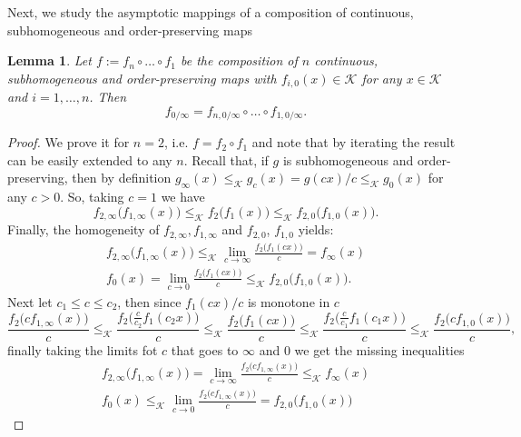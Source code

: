 \documentclass{article}
\newtheorem{lemma}[theorem]{Lemma}
\newcommand{\cone}{\mathcal{K}}
\newcommand{\cleq}{\leq_{\cone}}
\begin{document}
%
%
Next, we study the asymptotic mappings of a composition of continuous, subhomogeneous and order-preserving maps
%
\begin{lemma}\label{Lemma_limits_of_compositions}
    Let $f:=f_n\circ \dots \circ f_1$ be the composition of $n$ continuous, subhomogeneous and order-preserving maps with $f_{i,0}(x)\in\cone$ for any $x\in \cone$ and $i=1,\dots, n$. Then $$f_{0/\infty}=f_{n,0/\infty}\circ \dots \circ f_{1,0/\infty}.$$
\end{lemma}
\begin{proof}
    We prove it for $n=2$, i.e. $f=f_2\circ f_1$ and note that by iterating the result can be easily extended to any $n$. Recall that, if $g$ is subhomogeneous and order-preserving, then by definition $g_\infty(x)\cleq g_c(x)=g(cx)/c\cleq g_0(x)$ for any $c>0$. So, taking $c=1$ we have 
    \begin{equation}
      f_{2,\infty}\big( f_{1,\infty}(x)\big)\cleq   f_2\big(f_1(x)\big)\cleq f_{2,0}\big(f_{1,0}(x)\big).
    \end{equation}
    Finally, the homogeneity of $f_{2,\infty}, f_{1,\infty}$ and $f_{2,0}$, $f_{1,0}$ yields:
    \begin{equation}
    \begin{aligned}
      f_{2,\infty}\big( f_{1,\infty}(x)\big)\cleq \lim_{c\rightarrow \infty}   \frac{f_2\big(f_1( c x)\big)}{c}= f_{\infty}(x)\\
      f_{0}(x)=\lim_{c\rightarrow 0}   \frac{f_2\big(f_1( c x)\big)}{c} \cleq f_{2,0}\big(f_{1,0}(x)\big).
    \end{aligned}
    \end{equation}
    Next let $c_1\leq c \leq c_2$, then since $f_1(cx)/c$ is monotone in $c$
    \begin{equation}
      \frac{ f_2\big(c f_{1,\infty}(x)\big) }{c}\cleq \frac{f_2\big(\frac{c}{c_2}f_1(c_2 x)\big)}{c}\cleq \frac{f_2\big(f_1(cx)\big)}{c}\cleq \frac{f_2\big(\frac{c}{c_1}f_1(c_1 x)\big)}{c} \cleq \frac{f_2\big(c f_{1,0}(x)\big)}{c},
    \end{equation}
    finally taking the limits fot $c$ that goes to $\infty$ and $0$ we get the missing inequalities
    \begin{equation}
      \begin{aligned}
      f_{2,\infty}\big(f_{1,\infty}(x)\big)=\lim_{c\rightarrow \infty}\frac{ f_2\big(c f_{1,\infty}(x)\big) }{c} \cleq f_{\infty}(x)\\       f_0(x)\cleq \lim_{c\rightarrow 0}\frac{ f_2\big(c f_{1,\infty}(x)\big) }{c}=f_{2,0}\big( f_{1,0}(x)\big)
      \end{aligned}
    \end{equation}
    
\end{proof}
\end{document}
